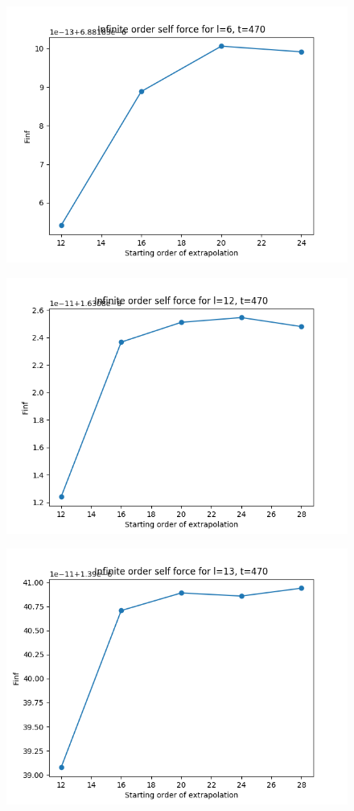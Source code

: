 \documentclass{article}
\begin{document}
\begin{figure}
  \includegraphics{bestfinfselectorplott470l6}
\end{figure}
\begin{figure}
  \includegraphics{bestfinfselectorplott470l12}
\end{figure}
\begin{figure}
  \includegraphics{bestfinfselectorplott470l13}
\end{figure}
\end{document}
